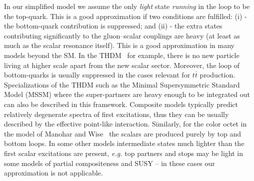 \documentclass[aps,prd,amsmath,amssymb,superscriptaddress, preprintnumbers,preprint,nofootinbib,a4paper]{revtex4}
\newcommand{\ttb}{t\bar{t}}
\begin{document}


In our simplified model we assume the only \emph{light} state \emph{running} in the loop to be the top-quark. 
This is a good approximation if two conditions are fulfilled: (i) - the bottom-quark contribution is suppressed;
and (ii) - the extra states contributing significantly to the gluon--scalar couplings are heavy
(at least as much as the scalar resonance itself). This is a good approximation in many models beyond the SM.
In the THDM~\cite{Branco:2011iw} for example, there is no new particle living at higher scale apart from the new
scalar sector. Moreover, the loop of bottom-quarks is usually suppressed in the cases relevant for $\ttb$ production.
Specializations of the THDM such as the Minimal Supersymmetric Standard Model (MSSM) where the super-partners are heavy enough to be integrated out can also be described in this framework. 
Composite models typically predict relatively degenerate spectra of first excitations, thus they can be usually described by the effective point-like interaction.  
Similarly, for the color octet in the model of Manohar and Wise~\cite{Manohar:2006ga} the scalars are produced purely by top and bottom loops. 
In some other models intermediate states much lighter than the first scalar excitations are present, \emph{e.g.} top partners and stops may be light in some models of partial compositeness and SUSY -- in these cases our approximation is not applicable.
\end{document}
